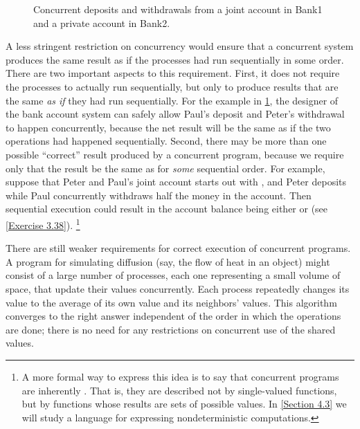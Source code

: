 \begin{figure}[tb]
	\centering
	
	\caption{
		Concurrent deposits and withdrawals from a joint account in Bank1 and a private account in Bank2.
	}
	\label{Figure 3.30}
\end{figure}

A less stringent restriction on concurrency would ensure that a concurrent system produces the same result as if the processes had run sequentially in some order.
There are two important aspects to this requirement.
First, it does not require the processes to actually run sequentially, but only to produce results that are the same \emph{as if} they had run sequentially.
For the example in \cref{Figure 3.30}, the designer of the bank account system can safely allow Paul’s deposit and Peter’s withdrawal to happen concurrently, because the net result will be the same as if the two operations had happened sequentially.
Second, there may be more than one possible “correct” result produced by a concurrent program, because we require only that the result be the same as for \emph{some} sequential order.
For example, suppose that Peter and Paul’s joint account starts out with , and Peter deposits  while Paul concurrently withdraws half the money in the account.
Then sequential execution could result in the account balance being either  or  (see \cref{Exercise 3.38}).%
\footnote{
	\label{Footnote 39} A more formal way to express this idea is to say that concurrent programs are inherently .
	That is, they are described not by single-valued functions, but by functions whose results are sets of possible values.
	In \cref{Section 4.3} we will study a language for expressing nondeterministic computations.
}

There are still weaker requirements for correct execution of concurrent programs.
A program for simulating diffusion (say, the flow of heat in an object) might consist of a large number of processes, each one representing a small volume of space, that update their values concurrently.
Each process repeatedly changes its value to the average of its own value and its neighbors’ values.
This algorithm converges to the right answer independent of the order in which the operations are done;
there is no need for any restrictions on concurrent use of the shared values.



